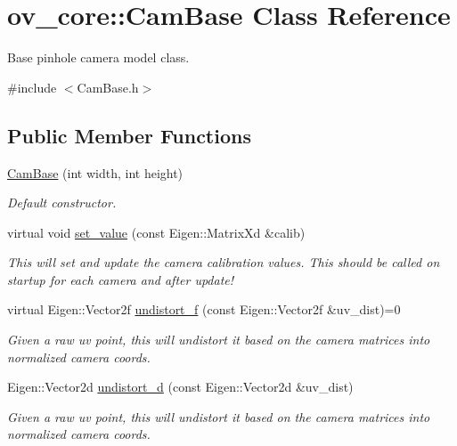 \hypertarget{classov__core_1_1CamBase}{}\section{ov\+\_\+core\+:\+:Cam\+Base Class Reference}
\label{classov__core_1_1CamBase}


Base pinhole camera model class.  




{\ttfamily \#include $<$Cam\+Base.\+h$>$}

\subsection*{Public Member Functions}
\begin{DoxyCompactItemize}
\item 
\hyperlink{classov__core_1_1CamBase_a1f11a6e4e8324d6843b578c0dabe0f94}{Cam\+Base} (int width, int height)
\begin{DoxyCompactList}\small\item\em Default constructor. \end{DoxyCompactList}\item 
virtual void \hyperlink{classov__core_1_1CamBase_a630f35e703c3893ae694fe0f14693216}{set\+\_\+value} (const Eigen\+::\+Matrix\+Xd \&calib)
\begin{DoxyCompactList}\small\item\em This will set and update the camera calibration values. This should be called on startup for each camera and after update! \end{DoxyCompactList}\item 
virtual Eigen\+::\+Vector2f \hyperlink{classov__core_1_1CamBase_ad0db03f97e5a12f5ad757f72e60f50e4}{undistort\+\_\+f} (const Eigen\+::\+Vector2f \&uv\+\_\+dist)=0
\begin{DoxyCompactList}\small\item\em Given a raw uv point, this will undistort it based on the camera matrices into normalized camera coords. \end{DoxyCompactList}\item 
Eigen\+::\+Vector2d \hyperlink{classov__core_1_1CamBase_ab910cf55ee13ca74eb4b8463ab32f1c4}{undistort\+\_\+d} (const Eigen\+::\+Vector2d \&uv\+\_\+dist)
\begin{DoxyCompactList}\small\item\em Given a raw uv point, this will undistort it based on the camera matrices into normalized camera coords. \end{DoxyCompactList}\item 

\end{DoxyCompactItemize}

